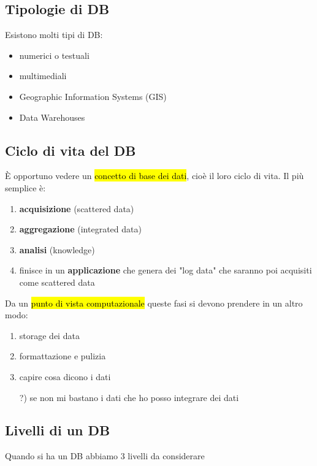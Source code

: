 \subsection{Tipologie di DB}

Esistono molti tipi di DB:

\begin{itemize}
	\item numerici o testuali
	\item multimediali
	\item Geographic Information Systems (GIS)
	\item Data Warehouses
\end{itemize}


\subsection{Ciclo di vita del DB}

È opportuno vedere un \hl{concetto di base dei dati}, cioè il loro ciclo di vita. Il più semplice è:

\begin{enumerate}
	\item \textbf{acquisizione} (scattered data)
	\item \textbf{aggregazione} (integrated data)
	\item \textbf{analisi} (knowledge)
	\item finisce in un \textbf{applicazione} che genera dei "log data" che saranno poi acquisiti come scattered data
\end{enumerate}

Da un \hl{punto di vista computazionale} queste fasi si devono prendere in un altro modo:

\begin{enumerate}
	\item storage dei data
	\item formattazione e pulizia
	\item capire cosa dicono i dati
	\item[?)] se non mi bastano i dati che ho posso integrare dei dati
\end{enumerate}


\subsection{Livelli di un DB}

Quando si ha un DB abbiamo 3 livelli da considerare

